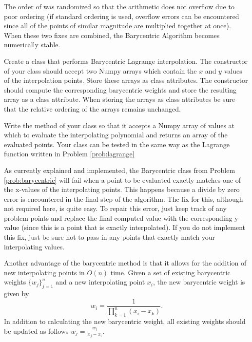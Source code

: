 The order of  was randomized so that the arithmetic does not overflow due to poor ordering (if standard ordering is used, overflow errors can be encountered since all 
of the points of similar magnitude are multiplied together at once).
When these two fixes are combined, the Barycentric Algorithm becomes numerically stable.

\begin{problem}
\label{prob:barycentric}
Create a class that performs Barycentric Lagrange interpolation.
The constructor of your class should accept two Numpy arrays which contain the $x$ and $y$ values of the interpolation points.
Store these arrays as class attributes.
The constructor should compute the corresponding barycentric weights and store the resulting array as a class attribute.
When storing the arrays as class attributes be sure that the relative ordering of the arrays remains unchanged.

Write the  method of your class so that it accepts a Numpy array of values at which to evaluate the interpolating polynomial and returns an array of the evaluated points.
Your class can be tested in the same way as the Lagrange function written in Problem \ref{prob:lagrange}
\end{problem}

\begin{warn}
As currently explained and implemented, the Barycentric class from Problem \ref{prob:barycentric} will fail when a point to be evaluated exactly matches one of the x-values of the interpolating points.
This happens because a divide by zero error is encountered in the final step of the algorithm.
The fix for this, although not required here, is quite easy.
To repair this error, just keep track of any problem points and replace the final computed value with the corresponding y-value (since this is a point that is exactly interpolated).
If you do not implement this fix, just be sure not to pass in any points that exactly match your interpolating values.
\end{warn}

Another advantage of the barycentric method is that it allows for the addition of new interpolating points in $O(n)$ time.
Given a set of existing barycentric weights $\{ w_j\}_{j=1}^n$ and a new interpolating point $x_i$, the new barycentric weight is given by
\[
w_i = \frac{1}{\prod_{k=1}^n (x_i-x_k)}.
\]
In addition to calculating the new barycentric weight, all existing weights should be updated as follows $w_j=\frac{w_j}{x_j-x_i}$.

